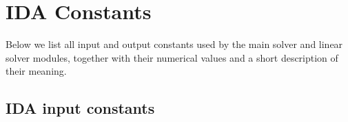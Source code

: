 \chapter{IDA Constants}\label{c:constants}

Below we list all input and output constants used by the main solver and 
linear solver modules, together with their numerical values and a short
description of their meaning.


\newlength{\tcolone}
\newlength{\tcoltwo}
\settowidth{\tcoltwo}{-20}
\newlength{\tcolthree}
\setlength{\tcolthree}{\textwidth}
\addtolength{\tcolthree}{-0.5in}
\addtolength{\tcolthree}{-\tcolone}
\addtolength{\tcolthree}{-\tcoltwo}

\tablefirsthead{}
\tablehead{}
\tabletail{}
\tablelasttail{}


\section{IDA input constants}\label{s:ida_in_constants}


